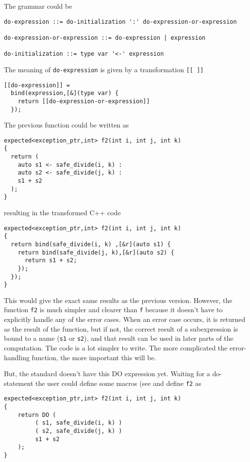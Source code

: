 \documentclass[a4paper,10pt]{article}
\newcommand{\cpp}[1]{\lstinline{#1}}
\begin{document}
The grammar could be

\begin{lstlisting}
do-expression ::= do-initialization ':' do-expression-or-expression

do-expression-or-expression ::= do-expression | expression

do-initialization ::= type var '<-' expression
\end{lstlisting}

The meaning of \cpp{do-expression}  is given by a transformation \cpp{[[ ]]}

\begin{lstlisting}
[[do-expression]] =
  bind(expression,[&](type var) {
    return [[do-expression-or-expression]]
  });
\end{lstlisting}

The previous function could be written as

\begin{lstlisting}
expected<exception_ptr,int> f2(int i, int j, int k)
{
  return (
  	auto s1 <- safe_divide(i, k) :
  	auto s2 <- safe_divide(j, k) :
   	s1 + s2
  );
}
\end{lstlisting}

resulting in the transformed C++ code

\begin{lstlisting}
expected<exception_ptr,int> f2(int i, int j, int k)
{
  return bind(safe_divide(i, k) ,[&r](auto s1) {
    return bind(safe_divide(j, k),[&r](auto s2) {
      return s1 + s2;
    });
  }); 
}
\end{lstlisting}

This would give the exact same results as the previous version. However, the function \cpp{f2} is much simpler and clearer than \cpp{f} because it doesn't have to explicitly handle any of the error cases. When an error case occurs, it is returned as the result of the function, but if not, the correct result of a subexpression is bound to a name (\cpp{s1} or \cpp{s2}), and that result can be used in later parts of the computation. The code is a lot simpler to write. The more complicated the error-handling function, the more important this will be.

But, the standard doesn't have this DO expression yet.
Waiting for a do-statement the user could define some macros (see \cite{monad_do_poc} and define \cpp{f2} as

\begin{lstlisting}
expected<exception_ptr,int> f2(int i, int j, int k)
{
    return DO (
         ( s1, safe_divide(i, k) )
         ( s2, safe_divide(j, k) )
         s1 + s2 
    );
}
\end{lstlisting}
\end{document}
